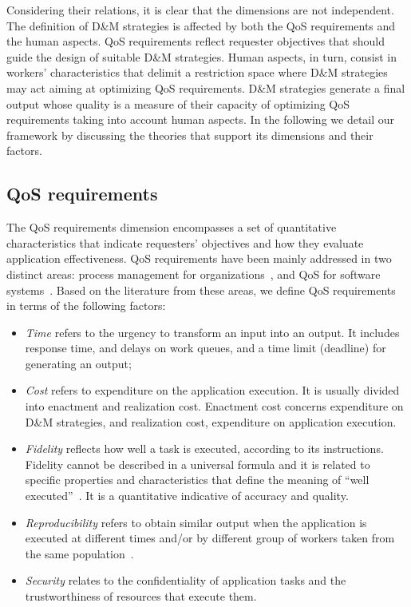 \documentclass[11pt]{bmc_article_s50}
\begin{document}
Considering their relations, it is clear that the dimensions are not independent. The definition of D\&M strategies is affected by both the QoS requirements and the human aspects. QoS requirements reflect requester objectives that should guide the design of suitable D\&M strategies. Human aspects, in turn, consist in workers' characteristics that delimit a restriction space where D\&M strategies may act aiming at optimizing QoS requirements. D\&M strategies generate a final output whose quality is a measure of their capacity of optimizing QoS requirements taking into account human aspects. In the following we detail our framework by discussing the theories that support its dimensions and their factors.

\subsection{QoS requirements}

The QoS requirements dimension encompasses a set of quantitative characteristics that indicate requesters' objectives and how they evaluate application effectiveness. QoS requirements have been mainly addressed in two distinct areas: process management for organizations~\cite{Aalst02workflowmanagement}, and QoS for software systems~\cite{Denning2003}. Based on the literature from these areas, we define QoS requirements in terms of the following factors:

\begin{itemize}
\item \textit{Time} refers to the urgency to transform an input into an output. It includes response time, and delays on work queues, and a time limit (deadline) for generating an output;
\item \textit{Cost} refers to expenditure on the application execution. It is usually divided into enactment and realization cost. Enactment cost concerns expenditure on D\&M strategies, and realization cost, expenditure on application execution.
\item \textit{Fidelity} reflects how well a task is executed, according to its instructions. Fidelity cannot be described in a universal formula and it is related to specific properties and characteristics that define the meaning of ``well executed''~\cite{Cardoso:2002}. It is a quantitative indicative of accuracy and quality.
\item\textit{Reproducibility} refers to obtain similar output when the application is executed at different times and/or by different group of workers taken from the same population~\cite{Paritosh:2012}.
\item \textit{Security} relates to the confidentiality of application tasks and the trustworthiness of resources that execute them.
\end{itemize}
\end{document}
